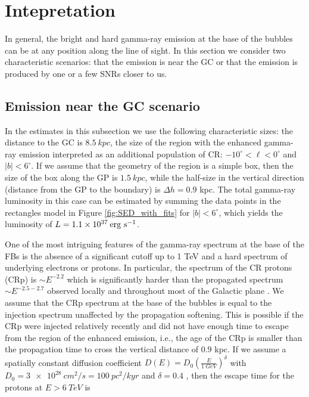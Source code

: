 \section{Intepretation}
\label{sec:Interpretation}

In general, the bright and hard gamma-ray emission at the base of the bubbles can be at any position along the line of sight.
In this section we consider two characteristic scenarios: that the emission is near the GC or that the emission is 
produced by one or a few SNRs closer to us. 

\subsection{Emission near the GC scenario}

In the estimates in this subsection we use the following characteristic sizes: 
the distance to the GC is $\SI{8.5}{kpc}$, 
the size of the region with the enhanced gamma-ray emission interpreted as an additional population of CR:
$-10^\circ < \ell < 0^\circ$ and $|b| < 6^\circ$.
If we assume that the geometry of the region is a simple box, then the size of the box along the GP is $\SI{1.5}{kpc}$,
while the half-size in the vertical direction (distance from the GP to the boundary) is $\Delta h = 0.9$ kpc.
The total gamma-ray luminosity in this case can be estimated 
by summing the data points in the rectangles model in Figure \ref{fig:SED_with_fits}
for $|b| < 6^\circ$, which yields the luminosity of $L = 1.1 \times 10^{37}\:{\rm erg\ s^{-1}}$.

One of the most intriguing features of the gamma-ray spectrum at the base of the FBs is the absence of a significant cutoff up to 1 TeV and 
a hard spectrum of underlying electrons or protons.
In particular, the spectrum of the CR protons (CRp) is $\sim E^{-2.2}$ which is significantly harder than the propagated spectrum
$\sim E^{-2.5 - 2.7}$ observed locally and throughout most of the Galactic plane \citep{2016ApJS..223...26A}.
We assume that the CRp spectrum at the base of the bubbles is equal to the injection spectrum unaffected by the 
propagation softening.
This is possible if the CRp were injected relatively recently and did not have enough time to escape from the region of the enhanced emission,
i.e., the age of the CRp is smaller than the propagation time to cross the vertical distance of 0.9 kpc.
If we assume a spatially constant diffusion coefficient $D(E) = D_0\left(\frac{E}{\SI{1}{GeV}}\right)^\delta$ with 
$D_0 = \SI{3e28}{cm^2/s} = \SI{100}{pc^2/kyr}$ and $\delta = 0.4$ \citep{2007ARNPS..57..285S},
then the escape time for the protons at $E > \SI{6}{TeV}$ is 

